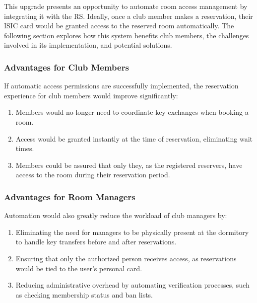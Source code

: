 This upgrade presents an opportunity to automate room access management by integrating it with the RS. Ideally, once a club member makes a reservation, their ISIC card would be granted access to the reserved room automatically. The following section explores how this system benefits club members, the challenges involved in its implementation, and potential solutions.

\subsubsection{Advantages for Club Members}

If automatic access permissions are successfully implemented, the reservation experience for club members would improve significantly:
\begin{enumerate}
	\item Members would no longer need to coordinate key exchanges when booking a room.
	\item Access would be granted instantly at the time of reservation, eliminating wait times.
	\item Members could be assured that only they, as the registered reservers, have access to the room during their reservation period.
\end{enumerate}

\subsubsection{Advantages for Room Managers}

Automation would also greatly reduce the workload of club managers by:
\begin{enumerate}
	\item Eliminating the need for managers to be physically present at the dormitory to handle key transfers before and after reservations.
	\item Ensuring that only the authorized person receives access, as reservations would be tied to the user’s personal card.
	\item Reducing administrative overhead by automating verification processes, such as checking membership status and ban lists.
\end{enumerate}

